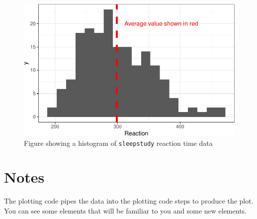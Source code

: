 \documentclass[
  letterpaper,
  DIV=11,
  numbers=noendperiod]{scrreprt}
\newenvironment{Shaded}{\begin{snugshade}}{\end{snugshade}}
\newcommand{\AttributeTok}[1]{\textcolor[rgb]{0.40,0.45,0.13}{#1}}
\newcommand{\DecValTok}[1]{\textcolor[rgb]{0.68,0.00,0.00}{#1}}
\newcommand{\FloatTok}[1]{\textcolor[rgb]{0.68,0.00,0.00}{#1}}
\newcommand{\FunctionTok}[1]{\textcolor[rgb]{0.28,0.35,0.67}{#1}}
\newcommand{\NormalTok}[1]{\textcolor[rgb]{0.00,0.23,0.31}{#1}}
\newcommand{\SpecialCharTok}[1]{\textcolor[rgb]{0.37,0.37,0.37}{#1}}
\newcommand{\StringTok}[1]{\textcolor[rgb]{0.13,0.47,0.30}{#1}}
\begin{document}
\begin{figure}[H]

{\centering \includegraphics{visualization_files/figure-pdf/fig-sleep-study-histogram-1.pdf}

}

\caption{\label{fig-sleep-study-histogram}Figure showing a histogram of
\texttt{sleepstudy} reaction time data}

\end{figure}

\section{Notes}

The plotting code pipes the data into the plotting code steps to produce
the plot. You can see some elements that will be familiar to you and
some new elements.

\begin{Shaded}
\end{Shaded}
\end{document}
